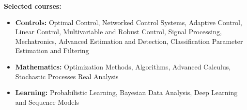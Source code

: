 \vspace{0.04in}
{\bf Selected courses:} \hfill
\vspace{-0.05in}
\begin{itemize}
    \item {\bf Controls: }Optimal Control, Networked Control Systems, Adaptive Control, Linear Control, Multivariable and Robust Control, Signal Processing, Mechatronics, Advanced Estimation and Detection, Classification Parameter Estimation and Filtering
    \vspace{-0.05in}
    \item {\bf Mathematics: }Optimization Methods, Algorithms, Advanced Calculus, Stochastic Processes Real Analysis
    \vspace{-0.05in}
    \item {\bf Learning: }Probabilistic Learning, Bayesian Data Analysis, Deep Learning and Sequence Models
\end{itemize}